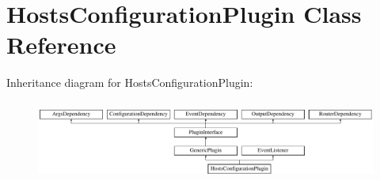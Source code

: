 \hypertarget{classHostsConfigurationPlugin}{\section{Hosts\-Configuration\-Plugin Class Reference}
\label{classHostsConfigurationPlugin}
}
Inheritance diagram for Hosts\-Configuration\-Plugin\-:\begin{figure}[H]
\begin{center}
\leavevmode
\includegraphics[height=2.666667cm]{classHostsConfigurationPlugin}
\end{center}
\end{figure}
